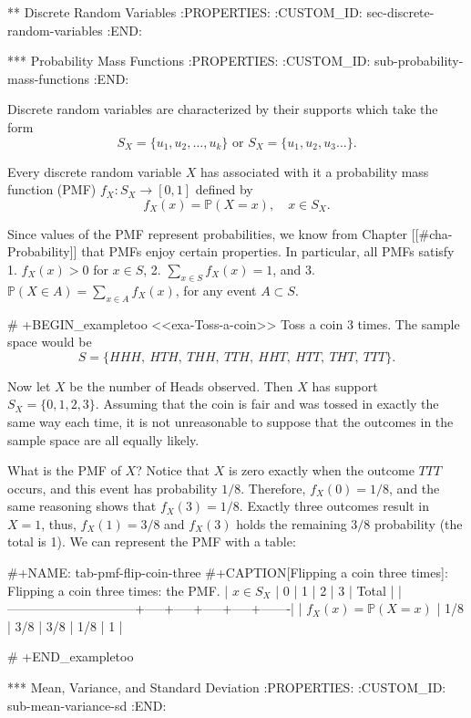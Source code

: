 ** Discrete Random Variables
:PROPERTIES:
:CUSTOM_ID: sec-discrete-random-variables
:END:

*** Probability Mass Functions
:PROPERTIES:
:CUSTOM_ID: sub-probability-mass-functions
:END:

Discrete random variables are characterized by their supports which
take the form
\begin{equation}
S_{X}=\{u_{1},u_{2},\ldots,u_{k}\}\mbox{ or }S_{X}=\{u_{1},u_{2},u_{3}\ldots\}.
\end{equation}

Every discrete random variable \(X\) has associated with it a
probability mass function (PMF) \(f_{X}:S_{X}\to[0,1]\) defined by
\begin{equation}
f_{X}(x)=\mathbb{P}(X=x),\quad x\in S_{X}.
\end{equation}

Since values of the PMF represent probabilities, we know from Chapter
[[#cha-Probability]] that PMFs enjoy certain properties. In particular, all
PMFs satisfy
1. \(f_{X}(x)>0\) for \(x\in S\),
2. \(\sum_{x\in S}f_{X}(x)=1\), and
3. \(\mathbb{P}(X\in A)=\sum_{x\in A}f_{X}(x)\), for any event
   \(A\subset S\).

# +BEGIN_exampletoo
<<exa-Toss-a-coin>> Toss a coin 3 times. The sample space would be \[
S=\{ HHH,\ HTH,\ THH,\ TTH,\ HHT,\ HTT,\ THT,\ TTT\}.  \]

Now let \(X\) be the number of Heads observed. Then \(X\) has support
\(S_{X}=\{ 0,1,2,3\} \). Assuming that the coin is fair and was tossed
in exactly the same way each time, it is not unreasonable to suppose
that the outcomes in the sample space are all equally likely.

What is the PMF of \(X\)? Notice that \(X\) is zero exactly when the
outcome \(TTT\) occurs, and this event has probability
\(1/8\). Therefore, \(f_{X}(0)=1/8\), and the same reasoning shows
that \(f_{X}(3)=1/8\). Exactly three outcomes result in \(X=1\), thus,
\(f_{X}(1)=3/8\) and \(f_{X}(3)\) holds the remaining \(3/8\)
probability (the total is 1). We can represent the PMF with a table:

#+NAME: tab-pmf-flip-coin-three
#+CAPTION[Flipping a coin three times]: Flipping a coin three times: the PMF.
| \(x\in S_{X}\)               |   0 |   1 |   2 |   3 | Total |
|------------------------------+-----+-----+-----+-----+-------|
| \(f_{X}(x)=\mathbb{P}(X=x)\) | 1/8 | 3/8 | 3/8 | 1/8 |     1 |

# +END_exampletoo

*** Mean, Variance, and Standard Deviation
:PROPERTIES:
:CUSTOM_ID: sub-mean-variance-sd
:END:

